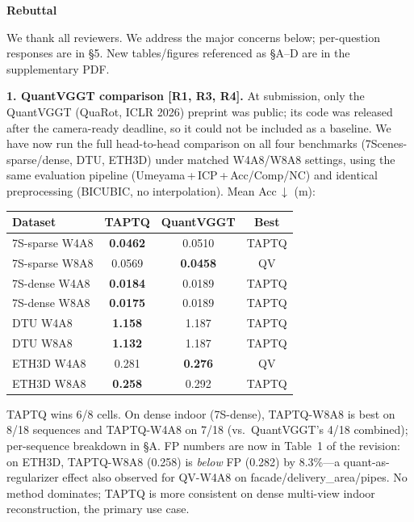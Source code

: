 \documentclass[9pt]{article}
\title{}
\author{}
\date{}
\begin{document}
\thispagestyle{empty}

\begin{center}\large\textbf{Rebuttal}\end{center}

\noindent We thank all reviewers. We address the major concerns below; per-question responses are in \S5. New tables/figures referenced as \S A--D are in the supplementary PDF.

\smallskip
\noindent\textbf{1. QuantVGGT comparison [R1, R3, R4].}
At submission, only the QuantVGGT (QuaRot, ICLR 2026) preprint was public; its code was released after the camera-ready deadline, so it could not be included as a baseline. We have now run the full head-to-head comparison on all four benchmarks (7Scenes-sparse/dense, DTU, ETH3D) under matched W4A8/W8A8 settings, using the same evaluation pipeline (Umeyama\,+\,ICP\,+\,Acc/Comp/NC) and identical preprocessing (BICUBIC, no interpolation). Mean Acc\,$\downarrow$ (m):

\begin{center}\small
\begin{tabular}{lccc}
\toprule
Dataset           & TAPTQ            & QuantVGGT       & Best \\
\midrule
7S-sparse W4A8    & \textbf{0.0462}  & 0.0510          & TAPTQ \\
7S-sparse W8A8    & 0.0569           & \textbf{0.0458} & QV    \\
7S-dense  W4A8    & \textbf{0.0184}  & 0.0189          & TAPTQ \\
7S-dense  W8A8    & \textbf{0.0175}  & 0.0189          & TAPTQ \\
DTU       W4A8    & \textbf{1.158}   & 1.187           & TAPTQ \\
DTU       W8A8    & \textbf{1.132}   & 1.187           & TAPTQ \\
ETH3D     W4A8    & 0.281            & \textbf{0.276}  & QV    \\
ETH3D     W8A8    & \textbf{0.258}   & 0.292           & TAPTQ \\
\bottomrule
\end{tabular}
\end{center}

TAPTQ wins 6/8 cells. On dense indoor (7S-dense), TAPTQ-W8A8 is best on 8/18 sequences and TAPTQ-W4A8 on 7/18 (vs.\ QuantVGGT's 4/18 combined); per-sequence breakdown in \S A. FP numbers are now in Table~1 of the revision: on ETH3D, TAPTQ-W8A8 (0.258) is \emph{below} FP (0.282) by 8.3\%---a quant-as-regularizer effect also observed for QV-W4A8 on facade/delivery\_area/pipes. No method dominates; TAPTQ is more consistent on dense multi-view indoor reconstruction, the primary use case.
\end{document}
